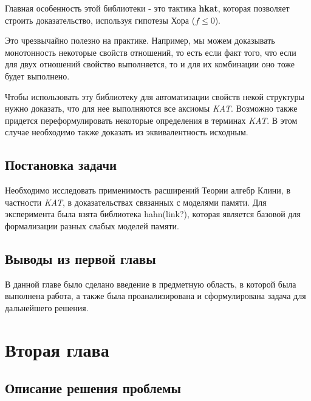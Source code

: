 \documentclass[times
              ]{itmo-student-thesis}
\begin{document}
    Главная особенность этой библиотеки - это тактика \textbf{hkat}, которая позволяет строить доказательство, используя гипотезы Хора ($ f \leq 0 $).

    Это чрезвычайно полезно на практике.
    Например, мы можем доказывать монотонность некоторые свойств отношений,
    то есть если факт того, что если для двух отношений свойство выполняется, то и для их комбинации оно тоже будет выполнено.

    Чтобы использовать эту библиотеку для автоматизации свойств некой структуры нужно доказать, что для нее выполняются все аксиомы \textit{KAT}. Возможно также придется переформулировать некоторые определения в терминах \textit{KAT}. В этом случае необходимо также доказать из эквивалентность исходным.


  \section{Постановка задачи}
    Необходимо исследовать применимость расширений Теории алгебр Клини, в частности \textit{KAT}, в доказательствах связанных с моделями памяти.
    Для эксперимента была взята библиотека hahn(link?), которая является базовой для формализации разных слабых моделей памяти.

  \section{Выводы из первой главы}
    В данной главе было сделано введение в предметную область, в которой была выполнена работа,
    а также была проанализирована и сформулирована задача для дальнейшего решения.
 \chapter{Вторая глава}

   \section{Описание решения проблемы}
\end{document}
